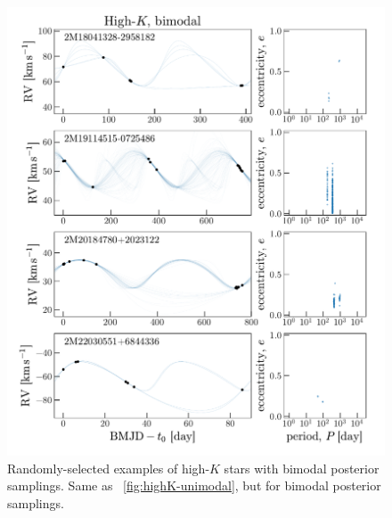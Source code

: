 \documentclass[modern, letterpaper]{aastex62}
\begin{document}
\begin{figure}[hp]
\begin{center}
\includegraphics[width=\textwidth]{highK-bimodal}
\end{center}
\caption{%
Randomly-selected examples of high-$K$ stars with bimodal posterior samplings.
Same as \figurename~\ref{fig:highK-unimodal}, but for bimodal posterior
samplings.
\label{fig:highK-bimodal}
}
\end{figure}
\end{document}
